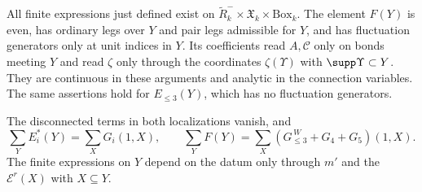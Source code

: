 \begin{proposition}\label{prop:rgnl-finite-locality}
All finite expressions just defined exist on
$\widetilde R_k^-\times\mathfrak X_k\times\mathrm{Box}_k$.
The element $F(Y)$ is even, has ordinary legs over $Y$ and
pair legs admissible for $Y$, and has fluctuation generators
only at unit indices in $Y$. Its coefficients read $A,\mathscr C$
only on bonds meeting $Y$ and read $\zeta$ only through the
coordinates $\zeta(\Upsilon)$ with $\supp\Upsilon\subset Y$.
They are continuous in these arguments and analytic in the
connection variables. The same assertions hold for $E_{\le3}(Y)$,
which has no fluctuation generators.

The disconnected terms in both localizations vanish, and
\begin{equation}\label{eq:rgnl-two-localization-sums}
 \sum_YE_i^*(Y)=\sum_XG_i(1,X),\qquad
 \sum_YF(Y)=\sum_X(G_{\le3}^{\,W}+G_4+G_5)(1,X).
\end{equation}
The finite expressions on $Y$ depend on the datum only through
$m'$ and the $\mathscr E^r(X)$ with $X\subseteq Y$.
\end{proposition}

